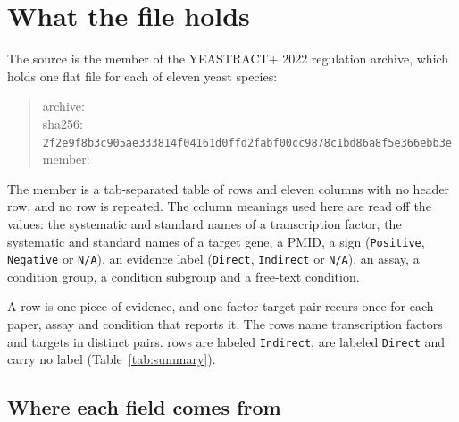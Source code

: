 
\section{What the file holds}\label{sec:file}

The source is the  member of the YEASTRACT+ 2022 regulation
archive, which holds one flat file for each of eleven yeast species:

\begin{quote}\small
archive: \\
sha256: \texttt{2f2e9f8b3c905ae333814f04161d0ffd\allowbreak 2fabf00cc9878c1bd86a8f5e366ebb3e}\\
member: 
\end{quote}

\noindent
The member is a tab-separated table of \ytNRows{} rows and eleven columns with no header row,
and no row is repeated. The column meanings used here are read off the values:
the systematic and standard names of a transcription factor, the systematic and
standard names of a target gene, a PMID, a sign (\texttt{Positive},
\texttt{Negative} or \texttt{N/A}), an evidence label (\texttt{Direct},
\texttt{Indirect} or \texttt{N/A}), an assay, a condition group, a condition
subgroup and a free-text condition.

A row is one piece of evidence, and one factor-target pair recurs once for each
paper, assay and condition that reports it. The \ytNRows{} rows name \ytNTfs{}
transcription factors and \ytNTargets{} targets in \ytNPairs{} distinct pairs.
\ytNIndirectRows{} rows are labeled \texttt{Indirect}, \ytNDirectRows{} are
labeled \texttt{Direct} and \ytNEvidenceNaRows{} carry no label
(Table~\ref{tab:summary}).



\subsection{Where each field comes from}\label{sec:fields}

